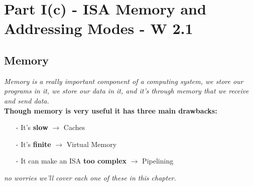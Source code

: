 \chapter{Part I(c) - ISA Memory and Addressing Modes - W 2.1}

\section{Memory}
\textit{Memory is a really important component of a computing system, we store our programs in it, we store our data in it, and it's through memory that we receive and send data.} \\ \vspace*{5px}
\textbf{Though memory is very useful it has three main drawbacks:} \\ \vspace*{5px}
\begin{itemize}
    \item[-] It's \textbf{slow} $\rightarrow$ Caches 
    \item[-] It's \textbf{finite} $\rightarrow$ Virtual Memory
    \item[-] It can make an ISA \textbf{too complex} $\rightarrow$ Pipelining
\end{itemize}
\textit{no worries we'll cover each one of these in this chapter.}

